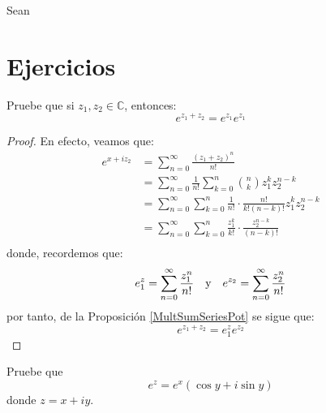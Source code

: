 \documentclass[12pt]{report}
\theoremstyle{largebreak}
\begin{document}
    \begin{propo}
        \label{MultSumSeriesPot}
        Sean 
    \end{propo}

    \section{Ejercicios}

    \begin{excer}
        Pruebe que si $z_1,z_2\in\mathbb{C}$, entonces:
        \begin{equation*}
            e^{z_1+z_2}=e^{ z_1}e^{ z_1}
        \end{equation*}
    \end{excer}

    \begin{proof}
        En efecto, veamos que:
        \begin{equation*}
            \begin{split}
                e^{ x+iz_2}&=\sum_{ n=0}^\infty\frac{(z_1+z_2)^n}{n!}\\
                &=\sum_{ n=0}^\infty\frac{1}{n!}\sum_{ k=0}^n\binom{n}{k}z_1^kz_2^{ n-k}\\
                &=\sum_{ n=0}^\infty\sum_{ k=0}^n\frac{1}{n!}\cdot\frac{n!}{k!(n-k)!}z_1^kz_2^{ n-k}\\
                &=\sum_{ n=0}^\infty\sum_{ k=0}^n\frac{z_1^k}{k!}\cdot\frac{z_2^{n-k}}{(n-k)!}\\
            \end{split}
        \end{equation*}
        donde, recordemos que:
        \begin{equation*}
            e^z_1=\sum_{ n=0}^\infty\frac{z_1^n}{n!}\quad\textup{y}\quad e^ {z_2}=\sum_{ n=0}^\infty\frac{z_2^n}{n!}
        \end{equation*}
        por tanto, de la Proposición \ref{MultSumSeriesPot} se sigue que:
        \begin{equation*}
            e^{ z_1+z_2}=e^z_1e^{ z_2}
        \end{equation*}
    \end{proof}

    \begin{excer}
        Pruebe que
        \begin{equation*}
            e^z=e^x(\cos y+i\sin y)
        \end{equation*}
        donde $z=x+iy$.
    \end{excer}
\end{document}
